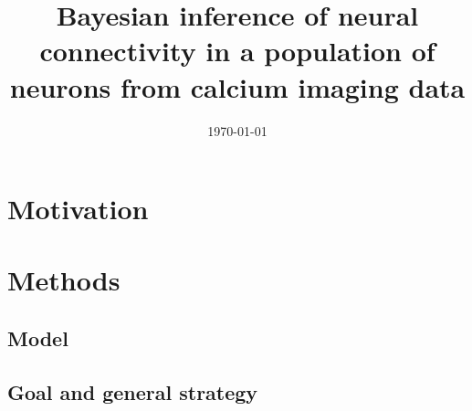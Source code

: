\documentclass[amsmath, amssymb]{revtex4}
\begin{document}

\date{\today}

\title{Bayesian inference of neural connectivity in a population of neurons from 
calcium imaging data}


\begin{abstract}

\end{abstract}

\maketitle
\tableofcontents

\section{Motivation}
\label{sec1}


\section{Methods}
\label{sec:methods}



\subsection{Model} %
\label{sec:methods:markov-setup}


\subsection{Goal and general strategy} %
\label{sec:methods:goal}

\end{document}
